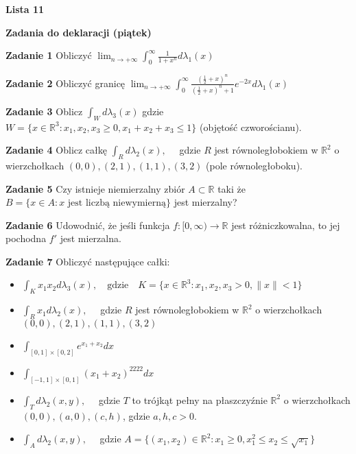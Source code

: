 \documentclass[a4paper,11pt]{article}
\newcommand{\RR}{\mathbb{R}}
\begin{document}
\begin{center}
  {\large\textbf{Lista 11}}
\end{center}

\hrulefill
\begin{center}
    \textbf{Zadania do deklaracji (piątek)}
\end{center}

\bigskip

\textbf{Zadanie 1} Obliczyć $\lim_{n\to +\infty} \int_{0}^\infty
\frac{1}{1+x^n}d\lambda_1(x)$

\bigskip

\textbf{Zadanie 2} Obliczyć granicę 
$\lim_{n\to +\infty} \int_0^\infty
\frac{(\frac{1}{2}+x)^n}{(\frac{1}{2}+x)^n + 1} e^{-2x} d\lambda_1(x)$

\bigskip

\textbf{Zadanie 3} Oblicz $\int_W d \lambda_3(x)$ gdzie  $W = \{x \in
\RR^3: x_1,x_2,x_3 \ge 0, x_1+x_2+x_3 \le 1\} $ (objętość czworościanu).

\bigskip

\textbf{Zadanie 4} Oblicz całkę  $\int_{R} d \lambda_2(x), \quad$
gdzie $R$ jest równoległobokiem w $\RR^2$ o wierzchołkach $(0,0), (2,1),
(1,1), (3,2)$ (pole równoległoboku).

\bigskip

\hrulefill

\bigskip

\textbf{Zadanie 5} Czy istnieje niemierzalny zbiór $A \subset \RR$ taki że 
$B= \{x \in A : x \text{~jest liczbą niewymierną}\}$ jest mierzalny?

\bigskip

\textbf{Zadanie 6} Udowodnić, że jeśli funkcja $f : [0,\infty) \to \RR$
jest różniczkowalna, to jej pochodna $f'$ jest mierzalna.

\bigskip

\textbf{Zadanie 7} Obliczyć następujące całki:

\begin{itemize}
  \item $\int_K x_1 x_2 d \lambda_3(x), \quad \text{gdzie} \quad K = \{x
    \in \RR^3: x_1,x_2,x_3 > 0,  \|x\| < 1\} $
  \item $\int_{R} x_1 d \lambda_2(x), \quad$ gdzie $R$ jest
    równoległobokiem w $\RR^2$ o wierzchołkach $(0,0), (2,1), (1,1),
    (3,2)$
  \item $\int_{[0,1]\times [0,2]} e^{x_1 + x_2} dx$ 
  \item $\int_{[-1,1]\times [0,1]} (x_1 + x_2)^{2222} dx$ 
  \item $\int_{T} d\lambda_2(x,y),\quad$ gdzie $T$ to trójkąt pełny na
    płaszczyźnie $\RR^2$ o wierzchołkach $(0,0),(a,0),(c,h)$, gdzie
    $a,h,c>0$.
  \item  $\int_A d\lambda_2(x,y), \quad$ gdzie  $A=\{(x_1,x_2) \in \RR^2:
    x_1 \ge 0, x_1^2 \le x_2 \le \sqrt{x_1} \} $
\end{itemize}
\end{document}
